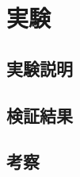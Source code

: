 \chapter{実験}
\label{chap:poordirection}


\section{実験説明}

\section{}

\section{検証結果}



\section{考察}

